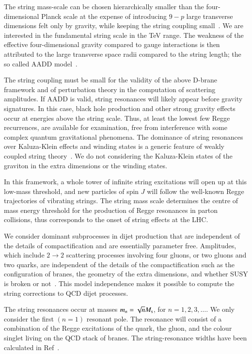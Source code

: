 The string mass-scale \Ms can be chosen hierarchically smaller than the
four-dimensional Planck scale at the expense of introducing $9-p$ large
transverse dimensions felt only by gravity, while keeping the string
coupling small~\cite{Cullen:2000ef}.
We are interested in the fundamental string scale in the TeV range.
The weakness of the effective four-dimensional gravity compared to gauge
interactions is then attributed to the large transverse space radii
compared to the string length; the so called AADD
model~\cite{ArkaniHamed:1998rs,Antoniadis:1998ig}. 

The string coupling must be small for the validity of the above D-brane
framework and of perturbation theory in the computation of scattering
amplitudes. 
If AADD is valid, string resonances will likely appear before gravity
signatures.
In this case, black hole production and other strong gravity effects
occur at energies above the string scale.
Thus, at least the lowest few Regge recurrences, are available for
examination, free from interference with some complex quantum
gravitational phenomena. 
The dominance of string resonances over Kaluza-Klein effects and winding
states is a generic feature of weakly coupled string
theory~\cite{Cullen:2000ef}. 
We do not considering the Kaluza-Klein states of the graviton in the
extra dimensions or the winding states.

In this framework, a whole tower of infinite string excitations will
open up at this low-mass threshold, and new particles of spin $J$ will
follow the well-known Regge trajectories of vibrating
strings.  
The string mass scale determines the centre of mass energy threshold 
for the production of Regge resonances in parton collisions, thus
corresponds to the onset of string effects at the LHC.

We consider dominant subprocesses in dijet production that are
independent of the details of compactification and are essentially
parameter free. 
Amplitudes, which include $2\to 2$ scattering processes involving four
gluons, or two gluons and two quarks, are independent of the details of
the compactification such as the configuration of branes, the geometry
of the extra dimensions, and whether SUSY is broken or
not~\cite{Lust:2008qc}. 
This model independence makes it possible to compute the string
corrections to QCD dijet processes.

The string resonances occur at masses $m_n = \sqrt{n} M_\mathrm{s}$, for $n = 1,
2, 3, \ldots$.
We only consider the first $(n=1)$ resonant pole.
The resonance will consist of a combination of the Regge excitations of
the quark, the gluon, and the colour singlet living on the QCD stack of
branes. 
The string-resonance widths have been calculated in
Ref~\cite{Anchordoqui:2008hi}. 

